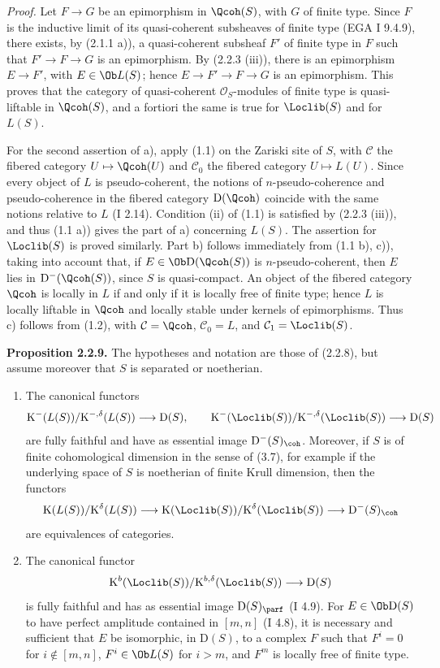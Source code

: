 \documentclass[11pt]{article}
\begin{document}
\emph{Proof.} Let $F\to G$ be an epimorphism in $\Qcoh(S)$, with $G$ of finite type. Since $F$ is the inductive limit of its quasi-coherent subsheaves of finite type (EGA I 9.4.9), there exists, by (2.1.1 a)), a quasi-coherent subsheaf $F'$ of finite type in $F$ such that $F'\to F\to G$ is an epimorphism. By (2.2.3 (iii)), there is an epimorphism $E\to F'$, with $E\in\Ob L(S)$; hence $E\to F'\to F\to G$ is an epimorphism. This proves that the category of quasi-coherent $\mathcal O_S$-modules of finite type is quasi-liftable in $\Qcoh(S)$, and a fortiori the same is true for $\Loclib(S)$ and for $L(S)$.

For the second assertion of a), apply (1.1) on the Zariski site of $S$, with $\mathcal C$ the fibered category $U\mapsto\Qcoh(U)$ and $\mathcal C_0$ the fibered category $U\mapsto L(U)$. Since every object of $L$ is pseudo-coherent, the notions of $n$-pseudo-coherence and pseudo-coherence in the fibered category $\mathrm D(\Qcoh)$ coincide with the same notions relative to $L$ (I 2.14). Condition (ii) of (1.1) is satisfied by (2.2.3 (iii)), and thus (1.1 a)) gives the part of a) concerning $L(S)$. The assertion for $\Loclib(S)$ is proved similarly. Part b) follows immediately from (1.1 b), c)), taking into account that, if $E\in\Ob\mathrm D(\Qcoh(S))$ is $n$-pseudo-coherent, then $E$ lies in $\mathrm D^{-}(\Qcoh(S))$, since $S$ is quasi-compact. An object of the fibered category $\Qcoh$ is locally in $L$ if and only if it is locally free of finite type; hence $L$ is locally liftable in $\Qcoh$ and locally stable under kernels of epimorphisms. Thus c) follows from (1.2), with $\mathcal C=\Qcoh$, $\mathcal C_0=L$, and $\mathcal C_1=\Loclib(S)$.

\textbf{Proposition 2.2.9.} The hypotheses and notation are those of (2.2.8), but assume moreover that $S$ is separated or noetherian.
\begin{enumerate}[label=\alph*)]
\item The canonical functors
\[
\mathrm K^{-}(L(S))/\mathrm K^{-,\delta}(L(S))\longrightarrow \mathrm D(S),
\qquad
\mathrm K^{-}(\Loclib(S))/\mathrm K^{-,\delta}(\Loclib(S))\longrightarrow \mathrm D(S)
\]
are fully faithful and have as essential image $\mathrm D^{-}(S)_{\coh}$. Moreover, if $S$ is of finite cohomological dimension in the sense of (3.7), for example if the underlying space of $S$ is noetherian of finite Krull dimension, then the functors
\[
\mathrm K(L(S))/\mathrm K^{\delta}(L(S))\longrightarrow
\mathrm K(\Loclib(S))/\mathrm K^{\delta}(\Loclib(S))\longrightarrow
\mathrm D^{-}(S)_{\coh}
\]
are equivalences of categories.
\item The canonical functor
\[
\mathrm K^b(\Loclib(S))/\mathrm K^{b,\delta}(\Loclib(S))\longrightarrow \mathrm D(S)
\]
is fully faithful and has as essential image $\mathrm D(S)_{\parf}$ (I 4.9). For $E\in\Ob\mathrm D(S)$ to have perfect amplitude contained in $[m,n]$ (I 4.8), it is necessary and sufficient that $E$ be isomorphic, in $\mathrm D(S)$, to a complex $F$ such that $F^i=0$ for $i\notin[m,n]$, $F^i\in\Ob L(S)$ for $i>m$, and $F^m$ is locally free of finite type.
\end{enumerate}
\end{document}
